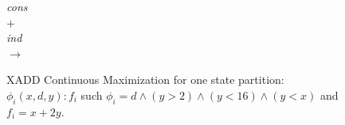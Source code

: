 \documentclass[twoside,11pt]{article}
\begin{document}
\begin{figure}
\begin{minipage}{0.10\linewidth}
 \vspace{-15mm}

 

 \vspace{15mm}

 
 \end{minipage}
 \begin{minipage}{1.0cm}
 \centering

 \vspace{14mm}

 \end{minipage}
 \begin{minipage}{0.21\linewidth}
 \centering
 
 \end{minipage}
 \begin{minipage}{0.6cm}
 \centering
 \small
 \emph{cons} \\ $+$ \\ \emph{ind} \\
 $\rightarrow$
 \end{minipage}
 \begin{minipage}{0.10\linewidth}
 \centering
 
 \end{minipage}
 \caption{XADD Continuous Maximization for one state partition: $\phi_i ( x,d,y): f_i$ such $ \phi_i =  d \wedge ( y > 2 ) \wedge ( y < 16) \wedge ( y < x )$  
 and  $f_i =  x + 2y$.}
 \label{fig:xadd_max}
 \end{figure}



\end{document}
